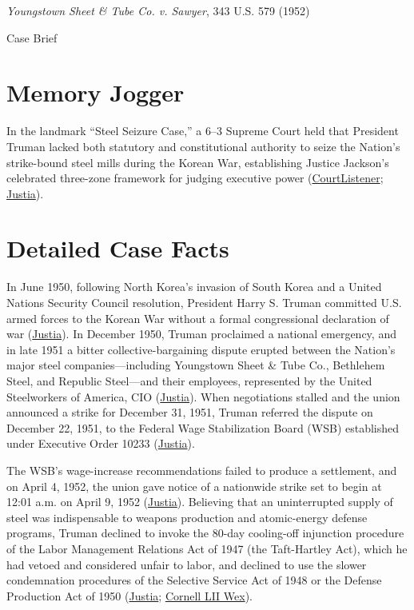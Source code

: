 \documentclass[12pt]{article}
\begin{document}
\begin{center}
{\LARGE \textit{Youngstown Sheet \& Tube Co. v. Sawyer}, 343 U.S. 579 (1952)\par}
\vspace{0.8em}
{\large Case Brief\par}
\end{center}
\vspace{1em}

\section{Memory Jogger}
In the landmark ``Steel Seizure Case,'' a 6--3 Supreme Court held that President Truman lacked both statutory and constitutional authority to seize the Nation's strike-bound steel mills during the Korean War, establishing Justice Jackson's celebrated three-zone framework for judging executive power (\href{https://www.courtlistener.com/opinion/105018/youngstown-sheet-tube-co-v-sawyer/}{CourtListener}; \href{https://supreme.justia.com/cases/federal/us/343/579/}{Justia}).

\section{Detailed Case Facts}
In June 1950, following North Korea's invasion of South Korea and a United Nations Security Council resolution, President Harry S. Truman committed U.S. armed forces to the Korean War without a formal congressional declaration of war (\href{https://supreme.justia.com/cases/federal/us/343/579/}{Justia}). In December 1950, Truman proclaimed a national emergency, and in late 1951 a bitter collective-bargaining dispute erupted between the Nation's major steel companies---including Youngstown Sheet \& Tube Co., Bethlehem Steel, and Republic Steel---and their employees, represented by the United Steelworkers of America, CIO (\href{https://supreme.justia.com/cases/federal/us/343/579/}{Justia}). When negotiations stalled and the union announced a strike for December 31, 1951, Truman referred the dispute on December 22, 1951, to the Federal Wage Stabilization Board (WSB) established under Executive Order 10233 (\href{https://supreme.justia.com/cases/federal/us/343/579/}{Justia}).

The WSB's wage-increase recommendations failed to produce a settlement, and on April 4, 1952, the union gave notice of a nationwide strike set to begin at 12:01 a.m. on April 9, 1952 (\href{https://supreme.justia.com/cases/federal/us/343/579/}{Justia}). Believing that an uninterrupted supply of steel was indispensable to weapons production and atomic-energy defense programs, Truman declined to invoke the 80-day cooling-off injunction procedure of the Labor Management Relations Act of 1947 (the Taft-Hartley Act), which he had vetoed and considered unfair to labor, and declined to use the slower condemnation procedures of the Selective Service Act of 1948 or the Defense Production Act of 1950 (\href{https://supreme.justia.com/cases/federal/us/343/579/}{Justia}; \href{https://www.law.cornell.edu/wex/youngstown_sheet_tube_co._v._sawyer_\%281952\%29}{Cornell LII Wex}).
\end{document}
